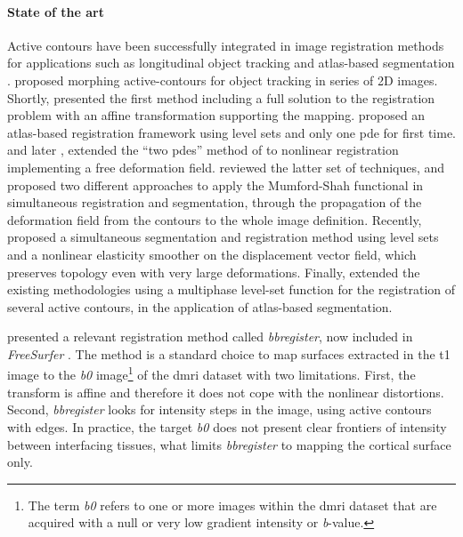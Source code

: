 \paragraph{State of the art}\label{sec:state_of_art}
  Active contours have been successfully integrated in image registration methods
  for applications such as longitudinal object tracking \citep{paragios_level_2003} and
  atlas-based segmentation \citep{gorthi_active_2011}.
\cite{bertalmio_morphing_2000} proposed morphing active-contours for object tracking in 
  series of 2D images.
Shortly, \cite{yezzi_variational_2003} presented the first method including a full solution to
  the registration problem with an affine transformation supporting the mapping.
\cite{vemuri_joint_2003} proposed an atlas-based registration framework using level sets and only
  one \gls*{pde} for first time.
\cite{unal_coupled_2005} and later \cite{wang_joint_2006},
  extended the ``two \glspl*{pde}'' method of \cite{yezzi_variational_2003}
  to nonlinear registration implementing a free deformation field.
\cite{droske_mumfordshah_2009} reviewed the latter set of techniques, and proposed two different
  approaches to apply the Mumford-Shah functional \citep{mumford_optimal_1989} in simultaneous
  registration and segmentation, through the propagation of the deformation field from
  the contours to the whole image definition.
Recently, \cite{guyader_combined_2011} proposed a simultaneous segmentation and
  registration method using level sets and a nonlinear elasticity smoother on the
  displacement vector field, which preserves topology even with very large deformations.
Finally, \cite{gorthi_active_2011} extended the existing methodologies using a multiphase
  level-set function for the registration of several active contours, in the application
  of atlas-based segmentation.
  
\cite{greve_accurate_2009} presented a relevant registration method called \emph{bbregister},
  now included in \emph{FreeSurfer} \citep{fischl_freesurfer_2012}.
The method is a standard choice to map surfaces extracted in the \gls*{t1} image to the \emph{b0}
  image\footnote{The term \emph{b0} refers to one or more images within the
  \gls*{dmri} dataset that are acquired with a null or very low gradient intensity or
   \emph{b}-value.} of the \gls*{dmri} dataset with two limitations.
First, the transform is affine and therefore it does not cope with the nonlinear distortions.
Second, \emph{bbregister} looks for intensity steps in the image, using active contours with edges.
In practice, the target \emph{b0} does not present clear frontiers of intensity between
  interfacing tissues, what limits \emph{bbregister} to mapping the cortical surface only.


